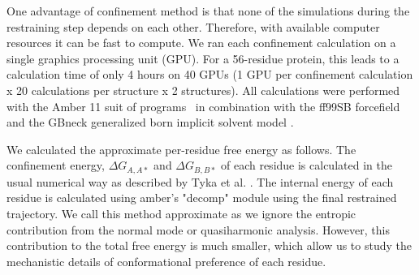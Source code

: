 \documentclass[12pt]{article}
\begin{document}
One advantage of confinement method is that none of the simulations during the restraining step depends on each other.
Therefore, with available computer resources it can be fast to compute. We ran each confinement calculation on a single
graphics processing unit (GPU). For a 56-residue protein, this leads to a calculation time of only 4 hours on 40 GPUs (1
GPU per confinement calculation x 20 calculations per structure x 2 structures). All calculations were performed with
the Amber 11 suit of programs~\cite{Case2012,Goetz2012} in combination with the ff99SB forcefield~\cite{Hornak2006} and
the GBneck generalized born implicit solvent model \cite{Mongan2006}.

We calculated the approximate per-residue free energy as follows. The confinement energy, $\Delta G_{A,A*}$ and $\Delta
G_{B,B*}$ of each residue is calculated in the usual numerical way as described by Tyka et al. \cite{Tyka2006}. The
internal energy of each residue is calculated using amber's "decomp" module using the final restrained trajectory. We
call this method approximate as we ignore the entropic contribution from the normal mode or quasiharmonic analysis.
However, this contribution to the total free energy is much smaller, which allow us to study the mechanistic details of
conformational preference of each residue.
\end{document}
